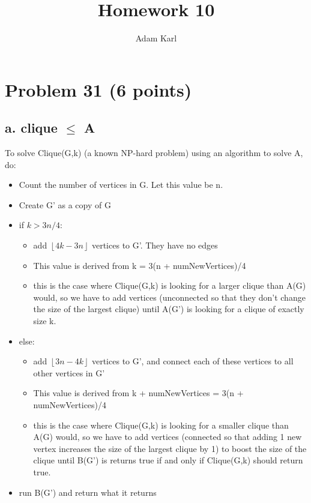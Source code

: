 \documentclass[a4paper]{article}
\title{Homework 10}
\author{Adam Karl}
\begin{document}
\maketitle

\section{Problem 31 (6 points)}
\subsection{a. clique $\leq$ A}
To solve Clique(G,k) (a known NP-hard problem) using an algorithm to solve A, do:

\begin{itemize}
    \item Count the number of vertices in G. Let this value be n.
    
    \item Create G' as a copy of G
    
    \item if $k > 3n/4$:
    \begin{itemize}
        \item add $\left\lfloor4k-3n\right\rfloor$ vertices to G'. They have no edges
        \item This value is derived from k = 3(n + numNewVertices)/4
        \item this is the case where Clique(G,k) is looking for a larger clique than A(G) would, so we have to add vertices (unconnected so that they don't change the size of the largest clique) until A(G') is looking for a clique of exactly size k.
    \end{itemize}
    
    \item else:
    \begin{itemize}
        \item add $\left\lfloor3n-4k\right\rfloor$ vertices to G', and connect each of these vertices to all other vertices in G'
        \item This value is derived from k + numNewVertices = 3(n + numNewVertices)/4
        \item this is the case where Clique(G,k) is looking for a smaller clique than A(G) would, so we have to add vertices (connected so that adding 1 new vertex increases the size of the largest clique by 1) to boost the size of the clique until B(G') is returns true if and only if Clique(G,k) should return true.
    \end{itemize}
    \item run B(G') and return what it returns
\end{itemize}
\end{document}
